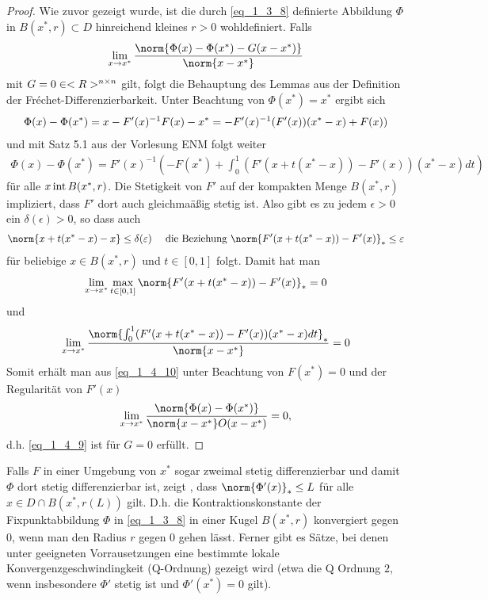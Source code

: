 \begin{proof}
	Wie zuvor gezeigt wurde, ist die durch \eqref{eq_1_3_8} definierte Abbildung $\Phi$ in $B(x^{\ast},r)\subset D$ hinreichend kleines $r>0$ wohldefiniert. Falls
	\begin{align}
		\lim_{x\to x^{\ast}} \frac{\norm{\Phi(x) - \Phi(x^{\ast}) - G(x-x^{\ast})}}{\norm{x-x^{\ast}}} \label{eq_1_4_9}
	\end{align}
	mit $G = 0\in <R>^{n \times n}$ gilt, folgt die Behauptung des Lemmas aus der Definition der Fréchet-Differenzierbarkeit. Unter Beachtung von $\Phi(x^{\ast}) = x^{\ast}$ ergibt sich
	\begin{align}
	\Phi(x) - \Phi(x^{\ast}) = x - F'(x)^{-1}F(x) - x^{\ast} = -F'(x)^{-1}(F'(x))(x^{\ast}-x)+F(x))\notag
	\end{align}
	und mit Satz 5.1 aus der Vorlesung ENM folgt weiter
	\begin{align}
		\Phi(x) - \Phi(x^{\ast}) = F'(x)^{-1}\left( -F(x^{\ast}) + \int_{0}^{1} (F'(x+t(x^{\ast}-x)) - F'(x))(x^{\ast}-x)dt\right)\label{eq_1_4_10}
	\end{align}
	für alle $x \operatorname{int} B(x^{\ast},r)$. Die Stetigkeit von $F'$ auf der kompakten Menge $B(x^{\ast},r)$ impliziert, dass $F'$ dort auch gleichmaäßig stetig ist. Also gibt es zu jedem $\epsilon > 0$ ein $\delta(\epsilon) > 0$, so dass auch
	\begin{align}
		\norm{x+t(x^{\ast}-x) - x}\le \delta(\epsilon) \quad \text{ die Beziehung } \norm{F'(x+t(x^{\ast}-x)) -F'(x)}_{\ast} \le \epsilon\notag
	\end{align}
	für beliebige $x \in B(x^{\ast},r)$ und $t \in [0,1]$ folgt. Damit hat man
	\begin{align}
		\lim_{x\to x^{\ast}}\max_{t\in[0,1]} \norm{F'(x+t(x^{\ast}-x)) -F'(x)}_{\ast} = 0 \notag
	\end{align}
	und
	\begin{align}
		\lim_{x\to x^{\ast}} \frac{\norm{\int_{0}^{1} (F'(x+t(x^{\ast} - x)) -F'(x))(x^{\ast}-x)dt}_{\ast}}{\norm{x-x^{\ast}}} = 0 \notag
	\end{align}
	Somit erhält man aus \eqref{eq_1_4_10} unter Beachtung von $F(x^{\ast}) = 0$ und der Regularität von $F'(x)$
	\begin{align}
		\lim_{x\to x^{\ast}} \frac{\norm{\Phi(x) - \Phi(x^{\ast})}}{\norm{x-x^{\ast}}O(x-x^{\ast})} = 0,\notag
	\end{align} %
	d.h. \eqref{eq_1_4_9} ist für $G=0$ erfüllt.
\end{proof}

\begin{remark}
	Falls $F$ in einer Umgebung von $x^{\ast}$ sogar zweimal stetig differenzierbar und damit $\Phi$ dort stetig differenzierbar ist, zeigt , dass $\norm{\Phi'(x)}_{\ast} \le L$ für alle $x \in D \cap B(x^{\ast},r(L))$ gilt. D.h. die Kontraktionskonstante der Fixpunktabbildung $\Phi$ in \eqref{eq_1_3_8} in einer Kugel $B(x^{\ast},r)$ konvergiert gegen $0$, wenn man den Radius $r$ gegen $0$ gehen lässt. Ferner gibt es Sätze, bei denen unter geeigneten Vorrausetzungen eine bestimmte lokale Konvergenzgeschwindingkeit (Q-Ordnung) gezeigt wird (etwa die Q Ordnung $2$, wenn insbesondere $\Phi'$ stetig ist und $\Phi'(x^{\ast}) = 0$ gilt).
\end{remark}